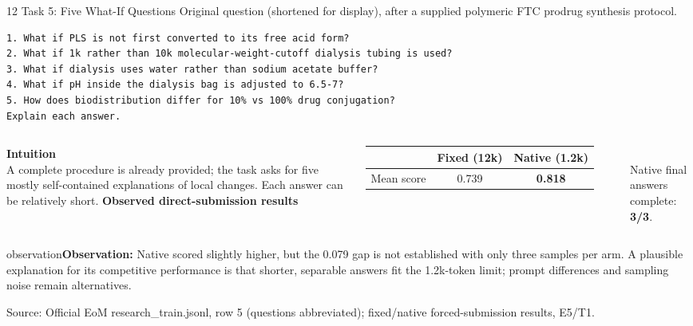 \documentclass[aspectratio=169,10pt]{beamer}
\newcommand{\observation}[1]{\vspace{2mm}\begin{beamercolorbox}[rounded=true,sep=1ex,wd=\textwidth]{observation}\small\textbf{Observation:} #1\end{beamercolorbox}}
\newcommand{\source}[1]{\vfill{\tiny\textcolor{muted}{Source: #1}}}
\begin{document}
\begin{frame}[fragile]{12 \quad Task 5: Five What-If Questions}
\scriptsize\textcolor{muted}{Original question (shortened for display), after a supplied polymeric FTC prodrug synthesis protocol.}
\vspace{1mm}
\begin{lstlisting}[basicstyle=\ttfamily\fontsize{7.2}{8.7}\selectfont]
1. What if PLS is not first converted to its free acid form?
2. What if 1k rather than 10k molecular-weight-cutoff dialysis tubing is used?
3. What if dialysis uses water rather than sodium acetate buffer?
4. What if pH inside the dialysis bag is adjusted to 6.5-7?
5. How does biodistribution differ for 10% vs 100% drug conjugation?
Explain each answer.
\end{lstlisting}
\vspace{2mm}
\begin{columns}[T,totalwidth=\textwidth]
\textbf{Intuition}\\[1mm]
A complete procedure is already provided; the task asks for five mostly self-contained explanations of local changes. Each answer can be relatively short.
\textbf{Observed direct-submission results}\\[1mm]
\begin{tabular}{lcc}
\toprule
 & Fixed (12k) & Native (1.2k)\\
\midrule
Mean score & 0.739 & \textbf{0.818}\\
\bottomrule
\end{tabular}\\[1mm]
Native final answers complete: \textbf{3/3}.
\end{columns}
\observation{Native scored slightly higher, but the 0.079 gap is not established with only three samples per arm. A plausible explanation for its competitive performance is that shorter, separable answers fit the 1.2k-token limit; prompt differences and sampling noise remain alternatives.}
\source{Official EoM research\_train.jsonl, row 5 (questions abbreviated); fixed/native forced-submission results, E5/T1.}
\end{frame}
\end{document}
